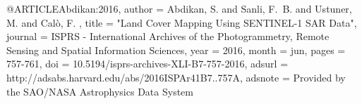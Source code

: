@ARTICLE{Abdikan:2016,
   author = {{Abdikan}, S. and {Sanli}, F.~B. and {Ustuner}, M. and {Cal{\`o}}, F.
	},
    title = "{Land Cover Mapping Using SENTINEL-1 SAR Data}",
  journal = {ISPRS - International Archives of the Photogrammetry, Remote Sensing and Spatial Information Sciences},
     year = 2016,
    month = jun,
    pages = {757-761},
      doi = {10.5194/isprs-archives-XLI-B7-757-2016},
   adsurl = {http://adsabs.harvard.edu/abs/2016ISPAr41B7..757A},
  adsnote = {Provided by the SAO/NASA Astrophysics Data System}
}